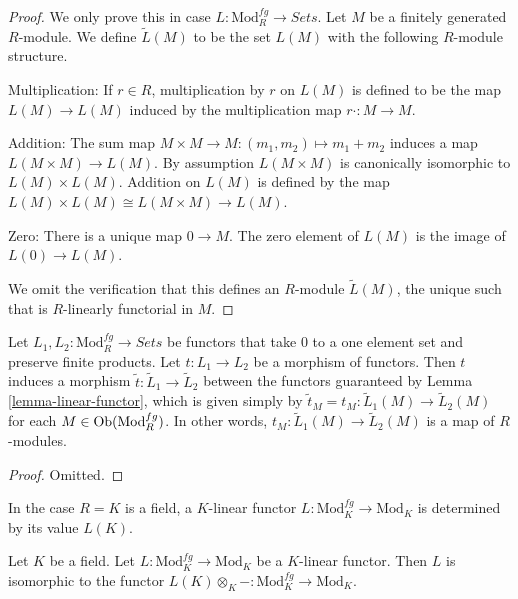 \begin{proof}
We only prove this in case $L: \text{Mod}^{fg}_R \to \textit{Sets}$.
Let $M$ be a finitely generated $R$-module. We define $\widetilde{L}(M)$ to be
the set $L(M)$ with the following $R$-module structure.

\medskip\noindent
Multiplication: If $r \in R$, multiplication by $r$ on $L(M)$ is defined to be
the map $L(M) \to L(M)$ induced by the multiplication map
$r \cdot : M \to M$.

\medskip\noindent
Addition: The sum map $M \times M \to M: (m_1, m_2) \mapsto m_1 + m_2$
induces a map $L(M \times M) \to L(M)$. By assumption $L(M \times M)$
is canonically isomorphic to $L(M) \times L(M)$.  Addition on $L(M)$ is defined
by the map $L(M) \times L(M) \cong L(M \times M) \to L(M)$.

\medskip\noindent
Zero: There is a unique map $0 \to M$. The zero element of $L(M)$ is
the image of $L(0) \to L(M)$.

\medskip\noindent
We omit the verification that this defines an $R$-module $\widetilde{L}(M)$,
the unique such that is $R$-linearly functorial in $M$.
\end{proof}

\begin{lemma}
\label{lemma-morphism-linear-functors}
Let $L_1, L_2: \text{Mod}^{fg}_R \to \textit{Sets}$ be
functors that take $0$ to a one element set and preserve finite products.
Let $t : L_1 \to L_2$ be a morphism of functors. Then $t$ induces a morphism
$\widetilde{t} : \widetilde{L}_1 \to \widetilde{L}_2$ between the
functors guaranteed by Lemma \ref{lemma-linear-functor}, which is given simply
by $\widetilde{t}_M = t_M: \widetilde{L}_1(M) \to \widetilde{L}_2(M)$
for each $M \in \mathop{\mathrm{Ob}}\nolimits(\text{Mod}^{fg}_R)$. In other words,
$t_M: \widetilde{L}_1(M) \to \widetilde{L}_2(M)$ is a map of $R$-modules.
\end{lemma}

\begin{proof}
Omitted.
\end{proof}

\noindent
In the case $R = K$ is a field, a $K$-linear functor
$L : \text{Mod}^{fg}_K \to \text{Mod}_K$ is determined by its value $L(K)$.

\begin{lemma}
\label{lemma-linear-functor-over-field}
Let $K$ be a field. Let $L: \text{Mod}^{fg}_K \to
\text{Mod}_K$ be a $K$-linear functor.  Then $L$ is isomorphic to the
functor $L(K) \otimes_K - : \text{Mod}^{fg}_K \to
\text{Mod}_K$.
\end{lemma}

